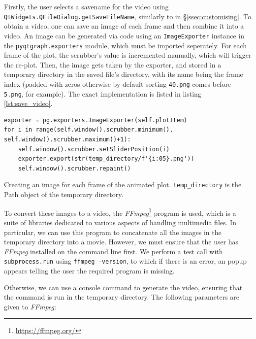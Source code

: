 \documentclass[12pt]{article}
\newenvironment{code}{\captionsetup{type=listing}}{\par\addvspace{\baselineskip}}
\begin{document}
Firstly, the user selects a savename for the video using \texttt{QtWidgets.QFileDialog.getSaveFileName}, similarly to in \S\ref{ssec:customising}. To obtain a video, one can save an image of each frame and then combine it into a video. An image can be generated via code using an \texttt{ImageExporter} instance in the \texttt{pyqtgraph.exporters} module, which must be imported seperately. For each frame of the plot, the scrubber's value is incremented manually, which will trigger the re-plot. Then, the image gets taken by the exporter, and stored in a temporary directory in the saved file's directory, with its name being the frame index (padded with zeros otherwise by default sorting \texttt{40.png} comes before \texttt{5.png}, for example). The exact implementation is listed in listing \ref{lst:save_video}.

\begin{code}\begin{verbatim}
exporter = pg.exporters.ImageExporter(self.plotItem)
for i in range(self.window().scrubber.minimum(), self.window().scrubber.maximum()+1):
    self.window().scrubber.setSliderPosition(i)
    exporter.export(str(temp_directory/f'{i:05}.png'))
    self.window().scrubber.repaint()
\end{verbatim}
\caption{Creating an image for each frame of the animated plot. \texttt{temp\_directory} is the Path object of the temporary directory.}
\label{lst:save_video}
\end{code}

To convert these images to a video, the \textit{FFmpeg}\footnote{\url{https://ffmpeg.org/}} program is used, which is a suite of libraries dedicated to various aspects of handling multimedia files. In particular, we can use this program to concatenate all the images in the temporary directory into a movie. However, we must ensure that the user has \textit{FFmpeg} installed on the command line first. We perform a test call with \texttt{subprocess.run} using \texttt{ffmpeg -version}, to which if there is an error, an popup appears telling the user the required program is missing.

Otherwise, we can use a console command to generate the video, ensuring that the command is run in the temporary directory. The following parameters are given to \textit{FFmpeg}:
\end{document}
